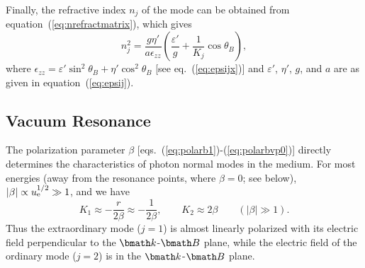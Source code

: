 \documentclass{mn2e}
\newcommand{\be}{\begin{equation}}
\newcommand{\ee}{\end{equation}}
\newcommand{\lp}{\left(}
\newcommand{\rp}{\right)}
\newcommand{\vecB}{{\bmath B}}
\newcommand{\veck}{{\bmath k}}
\newcommand{\thetab}{\theta_B}
\newcommand{\polarb}{\beta}
\newcommand{\uel}{u_{\rm e}}
\newcommand{\vpa}{a}
\newcommand{\vpr}{r}
\begin{document}
{Finally, the refractive index $n_j$ of the mode can be obtained from
equation~(\ref{eq:nrefractmatrix}), which gives
\be
n_j^2 = \frac{g\eta'}{\vpa\epsilon_{zz}}\lp\frac{\varepsilon'}{g}
 + \frac{1}{K_j}\cos\thetab\rp, \label{eq:nrefract2}
\ee
where $\epsilon_{zz}=\varepsilon'\sin^2\thetab+\eta'\cos^2\thetab$
[see eq.~(\ref{eq:epsijx})] and $\varepsilon'$, $\eta'$, $g$, and $\vpa$
are as given in equation~(\ref{eq:epsij}).

\subsection{Vacuum Resonance}
\label{sec:vpres}

The polarization parameter $\polarb$
[eqs.~(\ref{eq:polarb1})-(\ref{eq:polarbvp0})] directly determines the
characteristics of photon normal modes in the medium.
For most energies
(away from the resonance points, where $\polarb=0$; see
below), $|\polarb|\propto\uel^{1/2}\gg 1$, and we have
\be
K_1 \approx -\frac{\vpr}{2\polarb} \approx -\frac{1}{2\polarb},
 \qquad K_2 \approx 2\polarb \qquad (|\polarb|\gg 1). \label{eq:Kjhigh}
\ee
Thus the extraordinary mode ($j=1$) is almost linearly polarized
with its electric field perpendicular to the $\veck$-$\vecB$ plane,
while the electric field of the ordinary mode ($j=2$) is in the
$\veck$-$\vecB$ plane.

}
\end{document}
